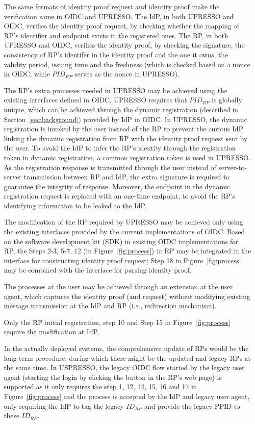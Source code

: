 The same formats of identity proof request and identity proof make the verification same in OIDC and UPRESSO. The IdP, in both UPRESSO and OIDC, verifies the identity proof request, by checking whether the mapping of RP's identifier and endpoint exists in the registered ones. The RP, in both UPRESSO and OIDC, verifies the identity proof, by checking the signature, the consistency of RP's identifer in the identity proof and the one it owns, the validity period, issuing time and the freshness (which is checked based on a nonce in  OIDC, while  $PID_{RP}$ serves as the nonce in UPRESSO).

The RP's extra processes needed in UPRESSO may be achieved using the existing interfaces defined in OIDC.
UPRESSO requires that $PID_{RP}$ is globally unique, which can be achieved through the dynamic registration (described in Section~\ref{sec:background}) provided by IdP in OIDC.
In UPRESSO, the dynamic registration is invoked by the user instead of the RP to prevent the curious IdP linking  the dynamic registration from RP with the identity proof request sent by the user.
To avoid the IdP to infer the RP's identity through the registration token in dynamic registration,
a common  registration token is used in UPRESSO.
As the registration response is transmitted through the user instead of server-to-server transmission between RP and IdP, the extra signature is required to guarantee the integrity of response. Moreover, the endpoint in the dynamic registration request is replaced with an one-time endpoint, to avoid the RP's identifying information to be leaked to the IdP.


The modification of the RP required by UPRESSO may be achieved only using the existing interfaces provided by the current implementations of OIDC.
Based on the software development kit (SDK) in existing OIDC implementations for RP, the Steps 2-3, 5-7, 12 (in Figure~\ref{fig:process}) in RP may be integrated in the interface for constructing identity proof request;
Step 18 in Figure~\ref{fig:process} may be combined with the interface for  parsing identity proof.

The processes at the user may be achieved through an extension at the user agent,
which captures the identity proof (and request)  without modifying existing message transmission at the IdP and RP (i.e., redirection mechanism). %


Only the RP initial registration, step 10 and Step 15 in Figure~\ref{fig:process} require the modification at IdP.

In the actually deployed systems, the comprehensive update of RPs would be the long term procedure, during which there might be the updated and legacy RPs at the same time. In USPRESSO, the legacy OIDC flow started by the legacy user agent (starting the login by clicking the button in the RP's web page) is supported as it only requires the step 1, 12, 14, 15, 16 and 17 in Figure~\ref{fig:process} and the process is accepted by the IdP and legacy user agent, only requiring the IdP to tag the legacy $ID_{RP}$ and provide the legacy PPID to these $ID_{RP}$.

